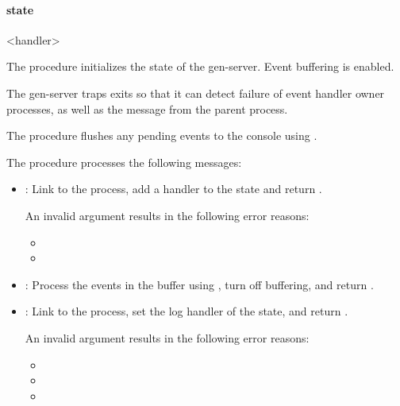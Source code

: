 \paragraph* {state}
\begin{tuple}\end{tuple}\antipar
\begin{argtbl}
\end{argtbl}

\begin{tupledef}{<handler>}
\end{tupledef}

The  procedure initializes the
state of the gen-server. Event buffering is enabled.

The gen-server traps exits so that it can detect failure of event
handler owner processes, as well as the  message from the
parent process.

The  procedure
flushes any pending events to the console using .

The  procedure
processes the following messages:

\antipar\begin{itemize}

\item {}: Link to the
   process, add a handler to the state and return
  .

  An invalid argument results in the following error reasons:
  \begin{itemize}
  \item {}
  \item {}
  \end{itemize}

\item {}: Process the events in the buffer using
  , turn off buffering, and return .

\item {}: Link to the
   process, set the log handler of the state, and return
  .

  An invalid argument results in the following error reasons:
  \begin{itemize}
  \item {}
  \item {}
  \item {}
  \end{itemize}

\end{itemize}

